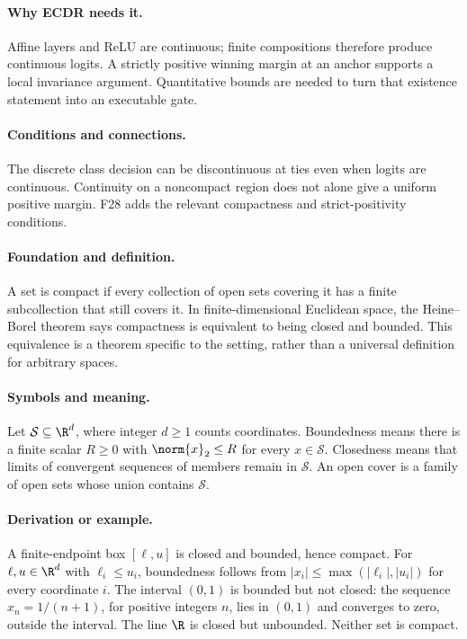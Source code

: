 \paragraph{Why ECDR needs it.}
Affine layers and ReLU are continuous; finite compositions therefore
produce continuous logits. A strictly positive winning margin at an
anchor supports a local invariance argument. Quantitative bounds are
needed to turn that existence statement into an executable gate.
\paragraph{Conditions and connections.}
The discrete class decision can be discontinuous at ties even when
logits are continuous. Continuity on a noncompact region does not alone
give a uniform positive margin. F28 adds the relevant compactness and
strict-positivity conditions.

\paragraph{Foundation and definition.}
A set is compact if every collection of open sets covering it has a
finite subcollection that still covers it. In finite-dimensional
Euclidean space, the Heine--Borel theorem says compactness is equivalent
to being closed and bounded. This equivalence is a theorem specific to
the setting, rather than a universal definition for arbitrary spaces.
\paragraph{Symbols and meaning.}
Let $\mathcal S\subseteq\R^d$, where integer $d\ge1$ counts
coordinates. Boundedness means there is a finite scalar $R\ge0$ with
$\norm{x}_2\le R$ for every $x\in\mathcal S$. Closedness means
that limits of convergent sequences of members remain in $\mathcal S$.
An open cover is a family of open sets whose union contains $\mathcal S$.
\paragraph{Derivation or example.}
A finite-endpoint box $[\ell,u]$ is closed and bounded, hence compact.
For $\ell,u\in\R^d$ with $\ell_i\le u_i$, boundedness follows from
$|x_i|\le\max(|\ell_i|,|u_i|)$ for every coordinate $i$.
The interval $(0,1)$ is bounded but not closed: the sequence
$x_n=1/(n+1)$, for positive integers $n$, lies in $(0,1)$ and converges to zero, outside the
interval. The line $\R$ is closed but unbounded. Neither set is compact.
